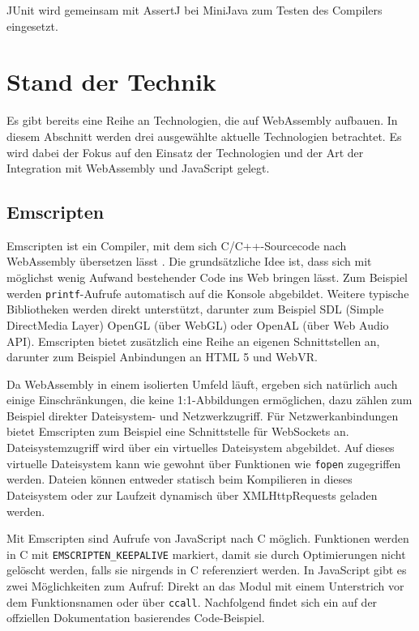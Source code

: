 JUnit wird gemeinsam mit AssertJ bei MiniJava zum Testen des Compilers eingesetzt.

\section{Stand der Technik}
Es gibt bereits eine Reihe an Technologien, die auf WebAssembly aufbauen. In diesem Abschnitt werden drei ausgewählte aktuelle Technologien betrachtet. Es wird dabei der Fokus auf den Einsatz der Technologien und der Art der Integration mit WebAssembly und JavaScript gelegt.

\subsection{Emscripten}

Emscripten ist ein Compiler, mit dem sich C/C++-Sourcecode nach WebAssembly übersetzen lässt \cite{Emscripten}. Die grundsätzliche Idee ist, dass sich mit möglichst wenig Aufwand bestehender Code ins Web bringen lässt. Zum Beispiel werden \lstinline{printf}-Aufrufe automatisch auf die Konsole abgebildet. Weitere typische Bibliotheken werden direkt unterstützt, darunter zum Beispiel SDL (Simple DirectMedia Layer) OpenGL (über WebGL) oder OpenAL (über Web Audio API). Emscripten bietet zusätzlich eine Reihe an eigenen Schnittstellen an, darunter zum Beispiel Anbindungen an HTML 5 und WebVR.

Da WebAssembly in einem isolierten Umfeld läuft, ergeben sich natürlich auch einige Einschränkungen, die keine 1:1-Abbildungen ermöglichen, dazu zählen zum Beispiel direkter Dateisystem- und Netzwerkzugriff. Für Netzwerkanbindungen bietet Emscripten zum Beispiel eine Schnittstelle für WebSockets an. Dateisystemzugriff wird über ein virtuelles Dateisystem abgebildet. Auf dieses virtuelle Dateisystem kann wie gewohnt über Funktionen wie \lstinline{fopen} zugegriffen werden. Dateien können entweder statisch beim Kompilieren in dieses Dateisystem oder zur Laufzeit dynamisch über XMLHttpRequests geladen werden.

Mit Emscripten sind Aufrufe von JavaScript nach C möglich. Funktionen werden in C mit \lstinline{EMSCRIPTEN_KEEPALIVE} markiert, damit sie durch Optimierungen nicht gelöscht werden, falls sie nirgends in C referenziert werden. In JavaScript gibt es zwei Möglichkeiten zum Aufruf: Direkt an das Modul mit einem Unterstrich vor dem Funktionsnamen oder über \lstinline{ccall}. Nachfolgend findet sich ein auf der offziellen Dokumentation basierendes Code-Beispiel.

